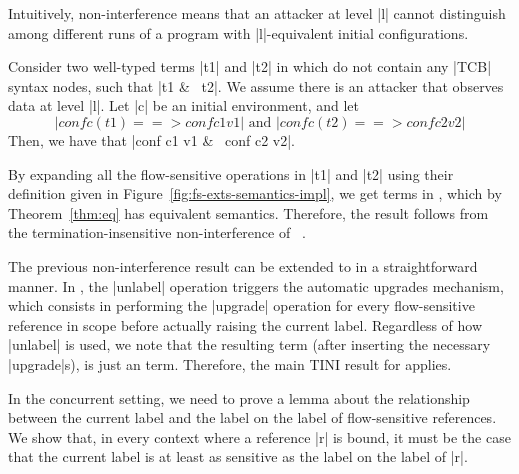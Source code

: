 Intuitively, non-interference means that an attacker at level |l|
cannot distinguish among different runs of a program with
|l|-equivalent initial configurations.

\begin{theorem}
  Consider two well-typed terms |t1| and |t2| in
  \liofs{} which do not contain any |TCB| syntax nodes, such that |t1 &~
  t2|. We assume there is an attacker that observes data at level
  |l|. Let |c| be an initial environment, and let
\[
    |conf c (t1) ==> conf c1 v1|\mbox{ and }
    |conf c (t2) ==> conf c2 v2|
\]
  Then, we have that |conf c1 v1 &~ conf c2 v2|.
\end{theorem}

\begin{proofsketch}
  By expanding all the flow-sensitive operations in |t1| and |t2| using their
  definition given in Figure~\ref{fig:fs-exts-semantics-impl}, we get
  terms in \lio{}, which by Theorem~\ref{thm:eq} has equivalent
  semantics. Therefore, the result follows from the
  termination-insensitive non-interference of \lio{}~\citep{stefan:lio}.
\end{proofsketch}

\begin{corollary}
  The previous non-interference result can be extended to \lioafs{} in
  a straightforward manner. In \lioafs{}, the |unlabel| operation
  triggers the automatic upgrades mechanism, which consists in
  performing the |upgrade| operation for every flow-sensitive
  reference in scope before actually raising the current label.
  Regardless of how |unlabel| is used, we note that the resulting term
  (after inserting the necessary |upgrade|s), is just an \liofs{}
  term. Therefore, the main TINI result for \liofs{} applies.


\end{corollary}

In the concurrent setting, we need to prove a lemma about the
relationship between the current label and the label on the label of
flow-sensitive references. We show that, in every context where a
reference |r| is bound, it must be the case that the current label is
at least as sensitive as the label on the label of |r|.

